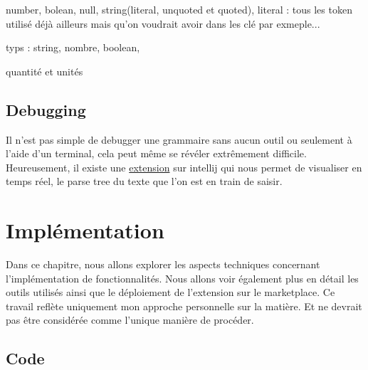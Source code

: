\documentclass[
    iict, %
    il, %
]{heig-tb}
\begin{document}

number, bolean, null, string(literal, unquoted et quoted),
literal : tous les token utilisé déjà ailleurs mais qu'on voudrait avoir dans les clé par exmeple...

typs : string, nombre, boolean,

quantité et unités


\section{Debugging}

Il n'est pas simple de debugger une grammaire sans aucun outil ou seulement à l'aide d'un terminal, cela peut même se révéler extrêmement difficile.
Heureusement, il existe une \href{https://plugins.jetbrains.com/plugin/7358-antlr-v4}{extension} sur intellij qui nous permet de visualiser en temps réel, le parse tree du texte que l'on est en train de saisir.




\chapter{Implémentation}
Dans ce chapitre, nous allons explorer les aspects techniques concernant l'implémentation de fonctionnalités. Nous allons voir également plus en détail les outils utilisés ainsi que le déploiement de l'extension sur le marketplace.
Ce travail reflète uniquement mon approche personnelle sur la matière. Et ne devrait pas être considérée comme l'unique manière de procéder.




\section{Code}
\end{document}
